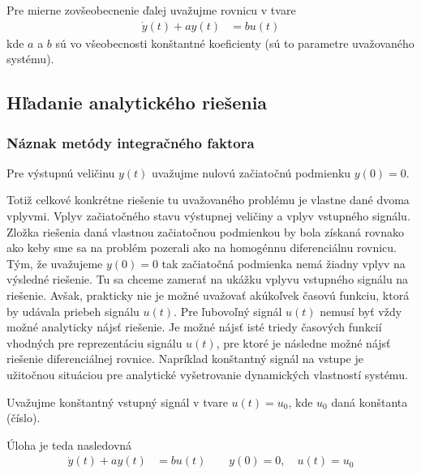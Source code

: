 \documentclass[a4paper, 10pt, ]{article}
\begin{document}
Pre mierne zovšeobecnenie ďalej uvažujme rovnicu v tvare 
\begin{align}
    \dot y(t) + a y(t) &=   b u(t)
\end{align}
kde $a$ a $b$ sú vo všeobecnosti konštantné koeficienty (sú to parametre uvažovaného systému).

\subsection{Hľadanie analytického riešenia}

\subsubsection{Náznak metódy integračného faktora}

Pre výstupnú veličinu $y(t)$ uvažujme nulovú začiatočnú podmienku $y(0) = 0$. 

Totiž celkové konkrétne riešenie tu uvažovaného problému je vlastne dané dvoma vplyvmi. Vplyv začiatočného stavu výstupnej veličiny a vplyv vstupného signálu. Zložka riešenia daná vlastnou začiatočnou podmienkou by bola získaná rovnako ako keby sme sa na problém pozerali ako na homogénnu diferenciálnu rovnicu. Tým, že uvažujeme $y(0) = 0$ tak začiatočná podmienka nemá žiadny vplyv na výsledné riešenie. Tu sa chceme zamerať na ukážku vplyvu vstupného signálu na riešenie. Avšak, prakticky nie je možné uvažovať akúkoľvek časovú funkciu, ktorá by udávala priebeh signálu $u(t)$. Pre ľubovoľný signál $u(t)$ nemusí byť vždy možné analyticky nájsť riešenie. Je možné nájsť isté triedy časových funkcií vhodných pre reprezentáciu signálu $u(t)$, pre ktoré je následne možné nájsť riešenie diferenciálnej rovnice. Napríklad konštantný signál na vstupe je užitočnou situáciou pre analytické vyšetrovanie dynamických vlastností systému.

Uvažujme konštantný vstupný signál v tvare $u(t) = u_0$, kde $u_0$ daná konštanta (číslo).

Úloha je teda nasledovná
\begin{align}
    \dot y(t) + a y(t) &=   b u(t) \qquad y(0) = 0, \quad u(t) = u_0
\end{align}
\end{document}
